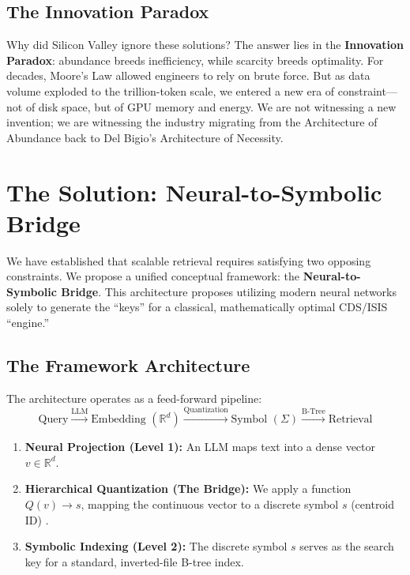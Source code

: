 \documentclass[manuscript,screen,nonacm]{acmart}
\begin{document}
\subsection{The Innovation Paradox}
Why did Silicon Valley ignore these solutions? The answer lies in the \textbf{Innovation Paradox}: abundance breeds inefficiency, while scarcity breeds optimality. For decades, Moore's Law allowed engineers to rely on brute force. But as data volume exploded to the trillion-token scale, we entered a new era of constraint---not of disk space, but of GPU memory and energy. We are not witnessing a new invention; we are witnessing the industry migrating from the Architecture of Abundance back to Del Bigio's Architecture of Necessity.

\section{The Solution: Neural-to-Symbolic Bridge}

We have established that scalable retrieval requires satisfying two opposing constraints. We propose a unified conceptual framework: the \textbf{Neural-to-Symbolic Bridge}. This architecture proposes utilizing modern neural networks solely to generate the ``keys'' for a classical, mathematically optimal CDS/ISIS ``engine.''

\subsection{The Framework Architecture}
The architecture operates as a feed-forward pipeline:
\[ \text{Query} \xrightarrow{\text{LLM}} \text{Embedding } (\mathbb{R}^d) \xrightarrow{\text{Quantization}} \text{Symbol } (\Sigma) \xrightarrow{\text{B-Tree}} \text{Retrieval} \]

\begin{enumerate}
    \item \textbf{Neural Projection (Level 1):} An LLM maps text into a dense vector $v \in \mathbb{R}^d$.
    \item \textbf{Hierarchical Quantization (The Bridge):} We apply a function $Q(v) \rightarrow s$, mapping the continuous vector to a discrete symbol $s$ (centroid ID) \cite{zandieh2025}.
    \item \textbf{Symbolic Indexing (Level 2):} The discrete symbol $s$ serves as the search key for a standard, inverted-file B-tree index.
\end{enumerate}
\end{document}
